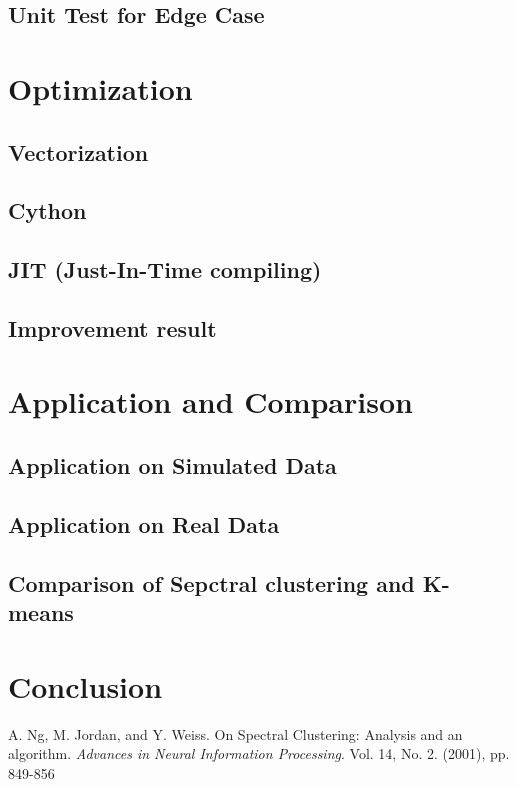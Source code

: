 \documentclass[11pt]{article}
\begin{document}
\subsection{Unit Test for Edge Case}

\section{Optimization}

\subsection{Vectorization}
\subsection{Cython}
\subsection{JIT (Just-In-Time compiling) }

\subsection{Improvement result}


\section{Application and Comparison}
\subsection{Application on Simulated Data}

\subsection{Application on Real Data}
\subsection{Comparison of Sepctral clustering and K-means}



\section{Conclusion}

%
%


\newpage
\begin{thebibliography}{9}



A. Ng, M. Jordan, and Y. Weiss.
On Spectral Clustering: Analysis and an algorithm.
\textit{Advances in Neural Information Processing}.
Vol. 14, No. 2. (2001), pp. 849-856 

\end{thebibliography}
\end{document}
